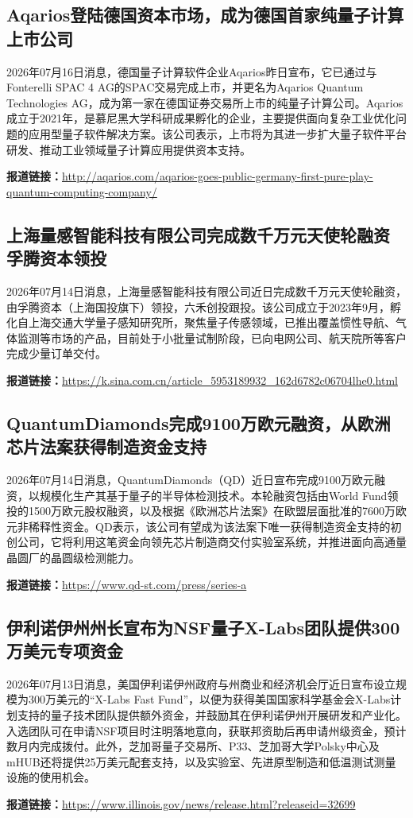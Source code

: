 \documentclass[12pt,a4paper]{ctexart}
\begin{document}
\subsection{ Aqarios登陆德国资本市场，成为德国首家纯量子计算上市公司 }

2026年07月16日消息，德国量子计算软件企业Aqarios昨日宣布，它已通过与Fonterelli SPAC 4 AG的SPAC交易完成上市，并更名为Aqarios Quantum Technologies AG，成为第一家在德国证券交易所上市的纯量子计算公司。Aqarios成立于2021年，是慕尼黑大学科研成果孵化的企业，主要提供面向复杂工业优化问题的应用型量子软件解决方案。该公司表示，上市将为其进一步扩大量子软件平台研发、推动工业领域量子计算应用提供资本支持。

\noindent\textbf{报道链接：}\url{http://aqarios.com/aqarios-goes-public-germany-first-pure-play-quantum-computing-company/}

\subsection{ 上海量感智能科技有限公司完成数千万元天使轮融资 孚腾资本领投 }

2026年07月14日消息，上海量感智能科技有限公司近日完成数千万元天使轮融资，由孚腾资本（上海国投旗下）领投，六禾创投跟投。该公司成立于2023年9月，孵化自上海交通大学量子感知研究所，聚焦量子传感领域，已推出覆盖惯性导航、气体监测等市场的产品，目前处于小批量试制阶段，已向电网公司、航天院所等客户完成少量订单交付。

\noindent\textbf{报道链接：}\url{https://k.sina.com.cn/article\_5953189932\_162d6782c06704lhe0.html}

\subsection{ QuantumDiamonds完成9100万欧元融资，从欧洲芯片法案获得制造资金支持 }

2026年07月14日消息，QuantumDiamonds（QD）近日宣布完成9100万欧元融资，以规模化生产其基于量子的半导体检测技术。本轮融资包括由World Fund领投的1500万欧元股权融资，以及根据《欧洲芯片法案》在欧盟层面批准的7600万欧元非稀释性资金。QD表示，该公司有望成为该法案下唯一获得制造资金支持的初创公司，它将利用这笔资金向领先芯片制造商交付实验室系统，并推进面向高通量晶圆厂的晶圆级检测能力。

\noindent\textbf{报道链接：}\url{https://www.qd-st.com/press/series-a}

\subsection{ 伊利诺伊州州长宣布为NSF量子X-Labs团队提供300万美元专项资金 }

2026年07月13日消息，美国伊利诺伊州政府与州商业和经济机会厅近日宣布设立规模为300万美元的“X-Labs Fast Fund”，以便为获得美国国家科学基金会X-Labs计划支持的量子技术团队提供额外资金，并鼓励其在伊利诺伊州开展研发和产业化。入选团队可在申请NSF项目时注明落地意向，获联邦资助后再申请州级资金，预计数月内完成拨付。此外，芝加哥量子交易所、P33、芝加哥大学Polsky中心及mHUB还将提供25万美元配套支持，以及实验室、先进原型制造和低温测试测量设施的使用机会。

\noindent\textbf{报道链接：}\url{https://www.illinois.gov/news/release.html?releaseid=32699}
\end{document}
